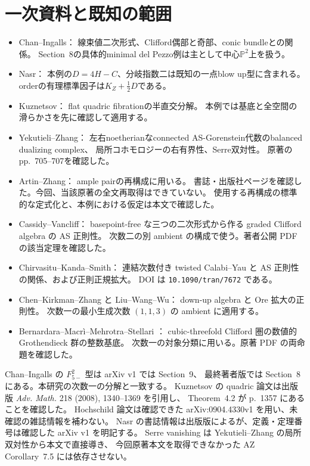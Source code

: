 \documentclass[11pt,a4paper]{ltjsarticle}
\begin{document}
\section{一次資料と既知の範囲}
\begin{itemize}
\item Chan--Ingalls\cite[Sections~2--3]{ChanIngalls2012}：
線束値二次形式、Clifford偶部と奇部、conic bundleとの関係。
Section~8の具体的minimal del Pezzo例は主として中心$\mathbb P^2$上を扱う。
\item Nasr\cite[arXiv v1, Definition~2.1, Theorems~1.1(2), 2.16]{Nasr2020}：
本例の$D=4H-C$、分岐指数二は既知の一点blow up型に含まれる。
orderの有理標準因子は$K_Z+\tfrac12D$である。
\item Kuznetsov\cite[Theorem~4.2]{KuznetsovQuadric}：
flat quadric fibrationの半直交分解。
本例では基底と全空間の滑らかさを先に確認して適用する。
\item Yekutieli--Zhang\cite[Theorem~4.2, Corollary~4.3]{YZ1997}：
左右noetherianなconnected AS-Gorenstein代数のbalanced dualizing complex、
局所コホモロジーの右有界性、Serre双対性。
原著のpp.\ 705--707を確認した。
\item Artin--Zhang\cite[Theorem~4.5]{AZ1994}：
ample pairの再構成に用いる。
書誌・出版社ページを確認した。今回、当該原著の全文再取得はできていない。
使用する再構成の標準的な定式化と、本例における仮定は本文で確認した。
\item Cassidy--Vancliff\cite[Theorem~1.1]{CV2010}：
basepoint-free な三つの二次形式から作る graded Clifford algebra の AS 正則性。
次数二の別 ambient の構成で使う。著者公開 PDF の該当定理を確認した。
\item Chirvasitu--Kanda--Smith\cite[arXiv v3, Propositions~1.6, 2.1]{CKS2019}：
連結次数付き twisted Calabi--Yau と AS 正則性の関係、および正則正規拡大。
DOI は \texttt{10.1090/tran/7672} である。
\item Chen--Kirkman--Zhang\cite[Lemma~1.1]{CKZ2017} と
Liu--Wang--Wu\cite[Theorem~3.3]{LWW2014}：
down-up algebra と Ore 拡大の正則性。
次数一の最小生成次数 $(1,1,3)$ の ambient に適用する。
\item Bernardara--Macr\`i--Mehrotra--Stellari
\cite[Propositions~2.9(ii), 2.12]{BMMS2012}：
cubic-threefold Clifford 圏の数値的 Grothendieck 群の整数基底。
次数一の対象分類に用いる。原著 PDF の両命題を確認した。
\end{itemize}

Chan--Ingalls の $F_{5-}^{2}$ 型は arXiv v1 では Section~9、
最終著者版では Section~8 にある。本研究の次数一の分解と一致する。
Kuznetsov の quadric 論文は出版版
\emph{Adv. Math.} 218 (2008), 1340--1369 を引用し、
Theorem~4.2 が p.~1357 にあることを確認した。
Hochschild 論文は確認できた arXiv:0904.4330v1 を用い、未確認の雑誌情報を補わない。
Nasr の書誌情報は出版版によるが、定義・定理番号は確認した arXiv v1 を明記する。
Serre vanishing は Yekutieli--Zhang の局所双対性から本文で直接導き、
今回原著本文を取得できなかった AZ Corollary~7.5 には依存させない。
\end{document}

